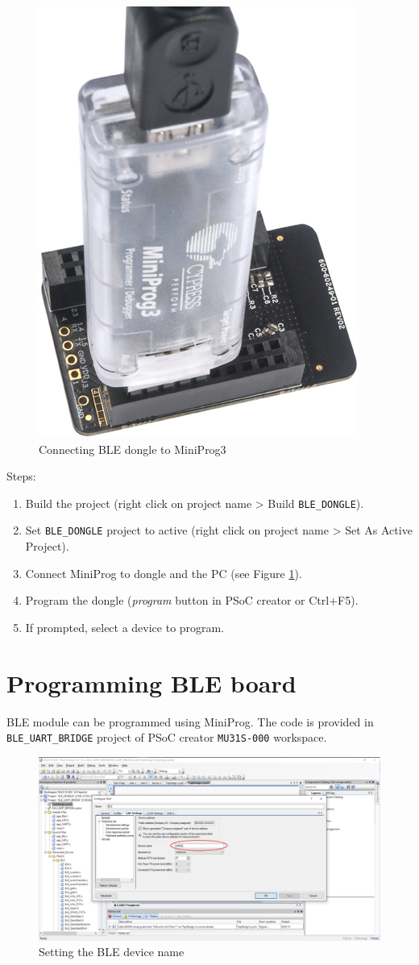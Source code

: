 \begin{figure}[htb]
    \centering
	  \includegraphics[width=0.25\linewidth]{figures/dongle_miniprog.jpg}
	\caption{Connecting BLE dongle to MiniProg3}
	\label{fig:dongle_prog}
\end{figure}

Steps:
\begin{enumerate}
	\item Build the project (right click on project name > Build \texttt{BLE\_DONGLE}).
	\item Set \texttt{BLE\_DONGLE} project to active (right click on project name > Set As Active Project).
	\item Connect MiniProg to dongle and the PC (see Figure \ref{fig:dongle_prog}).
	\item Program the dongle (\textit{program} button in PSoC creator or Ctrl+F5).
	\item If prompted, select a device to program.
\end{enumerate}

\section{Programming BLE board}

BLE module can be programmed using MiniProg. The code is provided in \texttt{BLE\_UART\_BRIDGE} project of PSoC creator \texttt{MU31S-000} workspace.

\begin{figure}[htb]
    \centering
	  \includegraphics[width=\linewidth]{figures/BLE_device_name.png}
	\caption{Setting the BLE device name}
	\label{fig:ble_device_name}
\end{figure}

